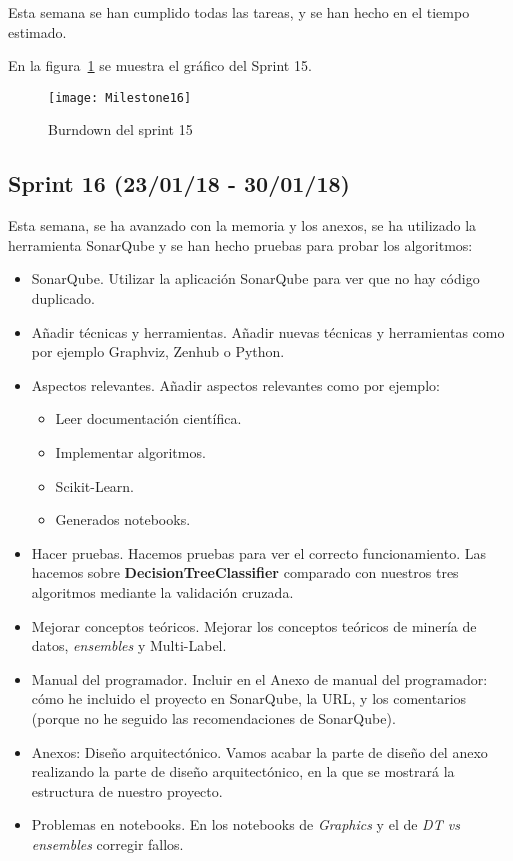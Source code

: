 Esta semana se han cumplido todas las tareas, y se han hecho en el tiempo estimado.

En la figura~\ref{fig:Milestone16} se muestra el gráfico del Sprint 15.

\begin{figure}
\centering
\texttt{[image: Milestone16]}
\caption{Burndown del sprint 15}
\label{fig:Milestone16}
\end{figure}

\subsection{Sprint 16 (23/01/18 - 30/01/18)}
Esta semana, se ha avanzado con la memoria y los anexos, se ha utilizado la herramienta SonarQube y se han hecho pruebas para probar los algoritmos:
\begin{itemize}
\item SonarQube. Utilizar la aplicación SonarQube para ver que no hay código duplicado.
\item Añadir técnicas y herramientas. Añadir nuevas técnicas y herramientas como por ejemplo Graphviz, Zenhub o Python.
\item Aspectos relevantes. Añadir aspectos relevantes como por ejemplo:
\begin{itemize}
	\item Leer documentación científica.
	\item Implementar algoritmos.
	\item Scikit-Learn.
	\item Generados notebooks.
\end{itemize}
\item Hacer pruebas. Hacemos pruebas para ver el correcto funcionamiento.
Las hacemos sobre \textbf{DecisionTreeClassifier} comparado con nuestros tres algoritmos mediante la validación cruzada.
\item Mejorar conceptos teóricos. Mejorar los conceptos teóricos de minería de datos, \textit{ensembles} y Multi-Label.
\item Manual del programador. Incluir en el Anexo de manual del programador: cómo he incluido el proyecto en SonarQube, la URL, y los comentarios (porque no he seguido las recomendaciones de SonarQube).
\item Anexos: Diseño arquitectónico. Vamos acabar la parte de diseño del anexo realizando la parte de diseño arquitectónico, en la que se mostrará la estructura de nuestro proyecto.
\item Problemas en notebooks. En los notebooks de \textit{Graphics} y el de \textit{DT vs ensembles} corregir fallos.
\end{itemize}

